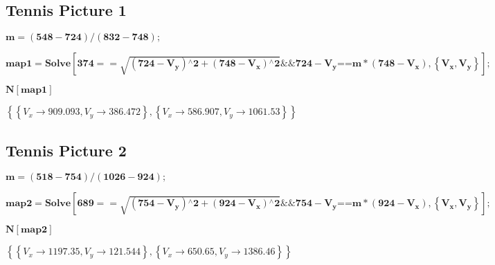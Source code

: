 \documentclass{article}
\begin{document}
\subsection*{Tennis Picture 1}

\begin{doublespace}
\noindent\(\pmb{m = (548 - 724)/ (832 - 748);}\)
\end{doublespace}

\begin{doublespace}
\noindent\(\pmb{\text{map1} = \text{Solve}\left[374==\sqrt{\left(724-V_y\right){}^{\wedge}2 + \left(748 - V_x\right){}^{\wedge}2}\&\& 724 - V_y\text{==}
m * \left(748 - V_x\right), \left\{V_x, V_y\right\}\right];}\)
\end{doublespace}

\begin{doublespace}
\noindent\(\pmb{N[\text{map1}]}\)
\end{doublespace}

\begin{doublespace}
\noindent\(\left\{\left\{V_x\to 909.093,V_y\to 386.472\right\},\left\{V_x\to 586.907,V_y\to 1061.53\right\}\right\}\)
\end{doublespace}

\subsection*{Tennis Picture 2}

\begin{doublespace}
\noindent\(\pmb{m = (518 - 754)/ (1026 - 924);}\)
\end{doublespace}

\begin{doublespace}
\noindent\(\pmb{\text{map2} = \text{Solve}\left[689==\sqrt{\left(754-V_y\right){}^{\wedge}2 + \left(924 - V_x\right){}^{\wedge}2}\&\& 754 - V_y\text{==}
m * \left(924 - V_x\right), \left\{V_x, V_y\right\}\right];}\)
\end{doublespace}

\begin{doublespace}
\noindent\(\pmb{N[\text{map2}]}\)
\end{doublespace}

\begin{doublespace}
\noindent\(\left\{\left\{V_x\to 1197.35,V_y\to 121.544\right\},\left\{V_x\to 650.65,V_y\to 1386.46\right\}\right\}\)
\end{doublespace}
\end{document}
